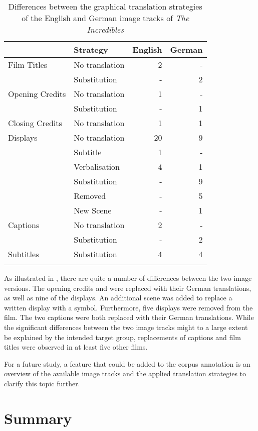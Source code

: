 \begin{table}
\begin{tabularx}{\textwidth}{QQrr}
\lsptoprule
&  Strategy &  English &  German\\
\midrule 
{Film Titles} & No translation & 2 & -\\
& Substitution & - & 2\\
\tablevspace
{Opening Credits} & No translation & 1 & -\\
& Substitution & - & 1\\
\tablevspace
{Closing Credits} & No translation & 1 & 1\\
\tablevspace
{Displays} & No translation & 20 & 9\\
& Subtitle & 1 & -\\
& Verbalisation & 4 & 1\\
& Substitution & - & 9\\
& Removed & - & 5\\
& New Scene & - & 1\\
\tablevspace
{Captions} & No translation & 2 & -\\
& Substitution & - & 2\\
\tablevspace
{Subtitles} & Substitution & 4 & 4\\
\lspbottomrule
\end{tabularx}
\caption{Differences between the graphical translation strategies of the English and German image tracks of \textit{The Incredibles}}
\label{tab:TAB5}
\end{table}

As illustrated in , there are quite a number of differences between the two image versions. The opening credits and  were replaced with their German translations, as well as nine of the displays. An additional scene was added to replace a written display with a symbol. Furthermore, five displays were removed from the film. The two captions were both replaced with their German translations. While the significant differences between the two image tracks might to a large extent be explained by the intended target group, replacements of captions and film titles were observed in at least five other films.

For a future study, a feature that could be added to the corpus annotation is an overview of the available image tracks and the applied translation strategies to clarify this topic further.

\section{Summary}\label{sec:2.7}

